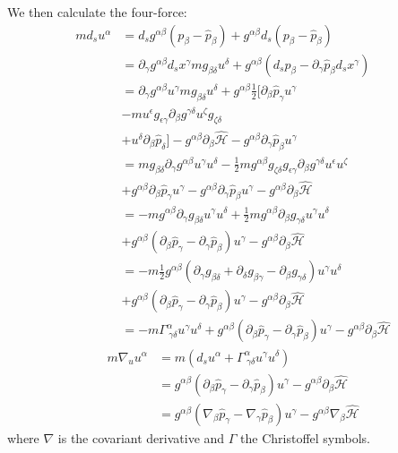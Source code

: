 \documentclass[aps,pra,10pt,twocolumn,floatfix,nofootinbib]{revtex4-1}
\theoremstyle{definition}
\begin{document}
We then calculate the four-force:
\begin{align*}
m d_s u^\alpha &= d_s g^{\alpha\beta}(p_\beta-\hat{p}_\beta) + g^{\alpha\beta} d_s (p_\beta-\hat{p}_\beta) \\
&= \partial_\gamma g^{\alpha\beta} d_s x^\gamma m g_{\beta \delta} u^\delta + g^{\alpha\beta} (d_s p_\beta - \partial_\gamma \hat{p}_\beta d_s x^\gamma) \\
&= \partial_\gamma g^{\alpha\beta} u^\gamma m g_{\beta \delta} u^\delta + g^{\alpha\beta} \frac{1}{2} [\partial_\beta \hat{p}_\gamma u^\gamma \\
&- m u^\epsilon g_{\epsilon\gamma} \partial_\beta g^{\gamma \delta} u^\zeta g_{\zeta\delta} \\
&+ u^\delta \partial_\beta \hat{p}_\delta ]- g^{\alpha\beta} \partial_\beta \hat{\mathcal{H}} - g^{\alpha\beta} \partial_\gamma \hat{p}_\beta u^\gamma \\
&= m  g_{\beta \delta} \partial_\gamma g^{\alpha\beta} u^\gamma u^\delta - \frac{1}{2} m g^{\alpha\beta} g_{\zeta\delta} g_{\epsilon\gamma} \partial_\beta g^{\gamma \delta} u^\epsilon u^\zeta  \\
&+ g^{\alpha\beta} \partial_\beta \hat{p}_\gamma u^\gamma - g^{\alpha\beta} \partial_\gamma \hat{p}_\beta u^\gamma
- g^{\alpha\beta} \partial_\beta \hat{\mathcal{H}}\\
&= - m  g^{\alpha \beta} \partial_\gamma g_{\beta\delta} u^\gamma u^\delta + \frac{1}{2} m g^{\alpha\beta} \partial_\beta g_{\gamma \delta} u^\gamma u^\delta  \\
&+ g^{\alpha\beta} (\partial_\beta \hat{p}_\gamma - \partial_\gamma \hat{p}_\beta ) u^\gamma
- g^{\alpha\beta} \partial_\beta \hat{\mathcal{H}}\\
&= - m \frac{1}{2} g^{\alpha \beta} ( \partial_\gamma g_{\beta\delta} + \partial_\delta g_{\beta\gamma} - \partial_\beta g_{\gamma \delta} ) u^\gamma u^\delta  \\
&+ g^{\alpha\beta} (\partial_\beta \hat{p}_\gamma - \partial_\gamma \hat{p}_\beta ) u^\gamma
- g^{\alpha\beta} \partial_\beta \hat{\mathcal{H}}\\
&= - m \Gamma ^\alpha_{\ \gamma \delta} u^\gamma u^\delta + g^{\alpha\beta} (\partial_\beta \hat{p}_\gamma - \partial_\gamma \hat{p}_\beta ) u^\gamma
- g^{\alpha\beta} \partial_\beta \hat{\mathcal{H}}
\end{align*}
\begin{align*}
m \nabla_{u} u^\alpha &= m (d_s u^\alpha + \Gamma ^\alpha_{\ \gamma \delta} u^\gamma u^\delta)  \\
&= g^{\alpha\beta} (\partial_\beta \hat{p}_\gamma - \partial_\gamma \hat{p}_\beta ) u^\gamma - g^{\alpha\beta} \partial_\beta \hat{\mathcal{H}}\\
&= g^{\alpha\beta} (\nabla_\beta \hat{p}_\gamma - \nabla_\gamma \hat{p}_\beta ) u^\gamma - g^{\alpha\beta} \nabla_\beta \hat{\mathcal{H}}
\end{align*}
where $\nabla$ is the covariant derivative and $\Gamma$ the Christoffel symbols.
\end{document}
